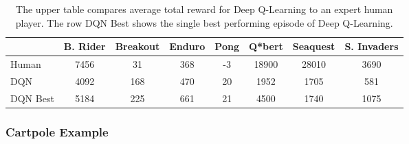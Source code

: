\begin{table}[h]
  \centering
  \begin{tabular}[c]{lccccccc}
    \hline
    						& B. Rider 		& Breakout 		& Enduro 	& Pong 	& Q*bert 		& Seaquest 	& S. Invaders			\\
    \hline
    Human			& 7456				& 31					& 368			& -3			& 18900		& 28010			& 3690						\\
    DQN				& 4092				& 168				& 470			& 20			& 1952			& 1705				& 581						\\
    DQN Best		& 5184				& 225				& 661			& 21			& 4500			& 1740				& 1075						\\
    \hline
  \end{tabular}
  \caption{ \cite{DQN} 
  					The upper table compares average total reward for Deep Q-Learning to an expert human player. 
  					The row DQN Best shows the single best performing episode of Deep Q-Learning. }
  \label{tab:comparison}
\end{table}


\subsubsection{Cartpole Example}


